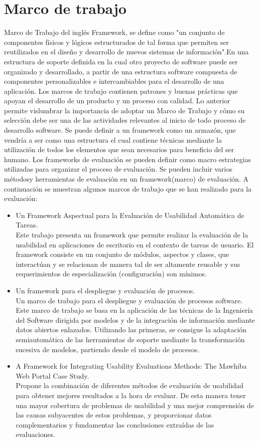 \section{Marco de trabajo}
Marco de Trabajo del inglés Framework, se define como "un conjunto de componentes físicos y lógicos estructurados de tal forma que permiten ser reutilizados en el diseño y desarrollo de nuevos sistemas de información".En una estructura de soporte definida en la cual otro proyecto de software puede ser organizado y desarrollado, a partir de una estructura software compuesta de componentes personalizables e intercambiables para el desarrollo de una aplicación. Los marcos de trabajo contienen patrones y buenas prácticas que apoyan el desarrollo de un producto y un proceso con calidad. Lo anterior permite vislumbrar la importancia de adoptar un Marco de Trabajo y cómo su selección debe ser una de las actividades relevantes al inicio de todo proceso de desarrollo software.
Se puede definir a un framework como un armazón, que vendría a ser como una estructura el cual contiene técnicas mediante la utilización de todos los elementos que sean necesarios para beneficio del ser humano\cite{rios}.
Los frameworks de evaluación se pueden definir como macro estrategias utilizadas para organizar el proceso de evaluación. Se pueden incluir varios métodosy herramientas de evaluación en un framework(marco) de evaluación.
A continuación se muestran algunos marcos de trabajo que se han realizado para la evaluación:
\begin{itemize}
\item Un Framework Aspectual para la Evaluación de Usabilidad Automática de Tareas.\\
Este trabajo presenta un framework que permite realizar la evaluación de la usabilidad en aplicaciones de escritorio en el contexto de tareas de usuario. El framework consiste en un conjunto de módulos, aspectos y clases, que interactúan y se relacionan de manera tal de ser altamente reusable y sus requerimientos de especialización (configuración) son mínimos.
\item Un framework para el despliegue y evaluación de procesos.\\
Un marco de trabajo para el despliegue y evaluación de procesos software. Este marco de trabajo se basa en la aplicación de las técnicas de la Ingeniería del Software dirigida por modelos y de la integración de información mediante datos abiertos enlazados. Utilizando las primeras, se consigue la adaptación semiautomática de las herramientas de soporte mediante la transformación sucesiva de modelos, partiendo desde el modelo de procesos.
\item A Framework for Integrating Usability Evaluations Methods: The Mawhiba Web Portal Case Study.\\
Propone la combinación de diferentes métodos de evaluación de usabilidad para obtener mejores resultados a la hora de evaluar.
De esta manera tener una mayor cobertura de problemas de usabilidad y una mejor comprensión de las causas subyacentes de estos problemas, y proporcionar datos complementarios y fundamentar las conclusiones extraídas de las evaluaciones.
\end{itemize}



